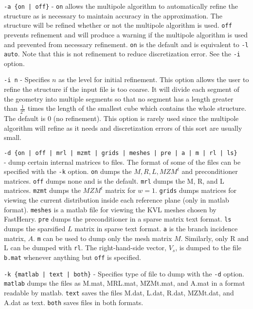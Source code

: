 \vspace{0.2in}
{\tt -a \{on | off\}} - {\tt on} allows the multipole algorithm to
automatically refine the structure as is necessary to maintain
accuracy in the approximation.  The structure will be refined whether
or not the multipole algorithm is used.  {\tt off} prevents refinement
and will produce a warning if the multipole algorithm is used and
prevented from necessary refinement. {\tt on} is the default and is
equivalent to {\tt -l auto}. 
Note that this is not refinement
to reduce discretization error.  See the {\tt -i} option. 

\vspace{0.2in}
{\tt -i n} - Specifies $n$ as the level for initial refinement.  This
option allows the user to refine the structure if the input file is
too coarse.  It will divide each segment of the geometry into multiple
segments so that no segment has a length greater than $ \frac{1}{2^n}
$ times the length of the smallest cube which contains the whole
structure.  The default is 0 (no refinement).  This option is rarely
used since the multipole algorithm will refine as it needs and
discretization errors of this sort are usually small.

\vspace{0.2in}
{\tt -d \{on | off | mrl | mzmt | grids | meshes | pre | a | m | rl |
ls\}} \\ - dump certain internal matrices to files.  The format of some of
the files can be specified with the {\tt -k} option.  {\tt on} dumps
the $M, R, L, MZM^t$ and preconditioner matrices. {\tt off} dumps none
and is the default.  {\tt mrl} dumps
the M, R, and L matrices. {\tt mzmt} dumps the $ MZM^t$ matrix for $w
= 1$.  {\tt grids} dumps matrices for viewing the current distribution
inside each reference plane (only in matlab format).  
{\tt meshes} is a matlab file for viewing
the KVL meshes chosen by FastHenry.  {\tt pre} dumps the
preconditioner in a sparse matrix text format. {\tt ls} dumps the
sparsified $L$ matrix in sparse text format.  {\tt a} is the branch
incidence matrix, $A$. {\tt m} can be used to dump only the mesh
matrix $M$.  Similarly, only R and L can be dumped with {\tt rl}.
The right-hand-side vector, $V_s$, is dumped to the file {\tt b.mat}
whenever anything but {\tt off} is specified.

\vspace{0.2in}
{\tt -k \{matlab | text | both\}} - Specifies type of file to dump
with the {\tt -d} option.  {\tt matlab} dumps the files as M.mat, MRL.mat,
MZMt.mat, and A.mat in a format readable by matlab.  
{\tt text} saves the files M.dat, L.dat, R.dat, MZMt.dat, and A.dat as text. 
{\tt both} saves files in both formats.

